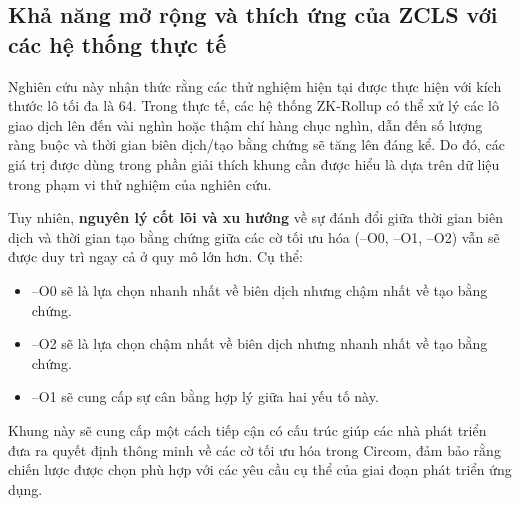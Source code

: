 
    \subsection{Khả năng mở rộng và thích ứng của ZCLS với các hệ thống thực tế}

    Nghiên cứu này nhận thức rằng các thử nghiệm hiện tại được thực hiện với kích thước lô tối đa là 64. Trong thực tế, các hệ thống ZK-Rollup có thể xử lý các lô giao dịch lên đến vài nghìn hoặc thậm chí hàng chục nghìn, dẫn đến số lượng ràng buộc và thời gian biên dịch/tạo bằng chứng sẽ tăng lên đáng kể. Do đó, các giá trị được dùng trong phần giải thích khung cần được hiểu là dựa trên dữ liệu trong phạm vi thử nghiệm của nghiên cứu.

    Tuy nhiên, \textbf{nguyên lý cốt lõi và xu hướng} về sự đánh đổi giữa thời gian biên dịch và thời gian tạo bằng chứng giữa các cờ tối ưu hóa (--O0, --O1, --O2) vẫn sẽ được duy trì ngay cả ở quy mô lớn hơn. Cụ thể:

    \begin{itemize}
    \item --O0 sẽ là lựa chọn nhanh nhất về biên dịch nhưng chậm nhất về tạo bằng chứng.
    \item --O2 sẽ là lựa chọn chậm nhất về biên dịch nhưng nhanh nhất về tạo bằng chứng.
    \item --O1 sẽ cung cấp sự cân bằng hợp lý giữa hai yếu tố này.
    \end{itemize}

    
    Khung này sẽ cung cấp một cách tiếp cận có cấu trúc giúp các nhà phát triển đưa ra quyết định thông minh về các cờ tối ưu hóa trong Circom, đảm bảo rằng chiến lược được chọn phù hợp với các yêu cầu cụ thể của giai đoạn phát triển ứng dụng.

